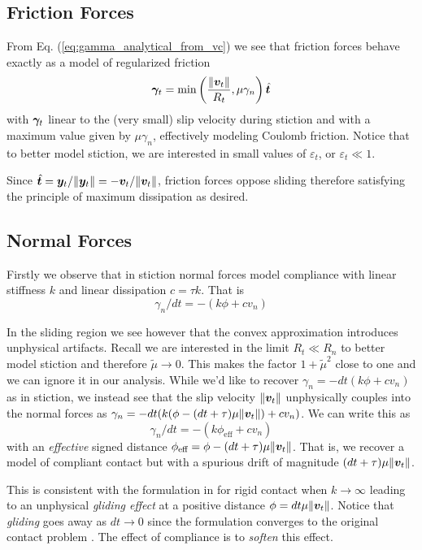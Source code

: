 \subsection{Friction Forces}
From Eq. (\ref{eq:gamma_analytical_from_vc}) we see that friction forces behave exactly as a
model of regularized friction
\begin{equation}
	{\bm\gamma}_t = \min\left(\frac{\Vert{\bm{v}}_t\Vert}{R_t}, \mu\gamma_n\right)\hat{{\bm{t}}}
\end{equation}
with ${\bm\gamma}_t$ linear to the (very small) slip velocity during stiction and
with a maximum value given by $\mu\gamma_n$, effectively modeling Coulomb
friction. Notice that to better model stiction, we are interested in small
values of $\varepsilon_t$, or $\varepsilon_t\ll 1$.

Since $\hat{{\bm{t}}} = {\bm{y}}_t/\Vert{\bm{y}}_t\Vert =
-{\bm{v}}_t/\Vert{\bm{v}}_t\Vert$, friction forces oppose sliding therefore
satisfying the principle of maximum dissipation as desired.

\subsection{Normal Forces}
Firstly we observe that in stiction normal forces model compliance with linear
stiffness $k$ and linear dissipation $c = \tau k$. That is
\begin{equation}
    \gamma_n/dt = -(k\phi + c v_n)
\end{equation}

In the sliding region we see however that the convex approximation introduces
unphysical artifacts. Recall we are interested in the limit $R_t \ll R_n$ to
better model stiction and therefore $\tilde\mu \rightarrow 0$. This makes the
factor $1+\tilde{\mu}^2$ close to one and we can ignore it in our analysis.
While we'd like to recover $\gamma_n = -dt(k\phi + c v_n)$ as in stiction, we
instead see that the slip velocity $\Vert{\bm{v}}_t\Vert$ unphysically couples
into the normal forces as $\gamma_n=-dt(k(\phi-(dt+\tau)\mu\Vert{\bm{v}}_t\Vert) +
cv_n)$. We can write this as
\begin{equation}
  \gamma_n/dt=-(k\phi_\text{eff} + c v_n)
\end{equation}
with an \textit{effective} signed distance $\phi_\text{eff} =
\phi-(dt+\tau)\mu\Vert{\bm{v}}_t\Vert$. That is, we recover a model of compliant
contact but with a spurious drift of magnitude $(dt+\tau)\mu\Vert{\bm{v}}_t\Vert$.

This is consistent with the formulation in \cite{bib:anitescu2010} for rigid
contact when $k\rightarrow \infty$ leading to an unphysical \textit{gliding
effect} at a positive distance $\phi=dt\mu\Vert{\bm{v}}_t\Vert$. Notice that
\textit{gliding} goes away as $dt\rightarrow 0$ since the formulation converges
to the original contact problem \cite{bib:anitescu2006}. The effect of
compliance is to \textit{soften} this effect. 

